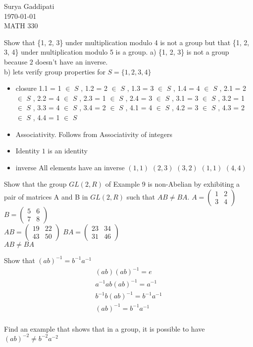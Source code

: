 \documentclass[12pt]{article}
\newenvironment{faq}{\begin{description}[style=nextline]}{\end{description}}
\begin{document}
 
Surya Gaddipati\\
\today \\
MATH 330 
\begin{faq}
\item[Show that \{1, 2, 3\} under multiplication modulo 4 is not a group but that \{1, 2, 3, 4\} under multiplication modulo 5 is a group.]
  a) \{1, 2, 3\}  is not a group because  $2$ doesn't have an inverse. \\
b) lets verify group properties for $S = \{1, 2, 3, 4\} $

 \begin{itemize}
   \item closure
     1.1 = 1 $\in$ $S$ , 
     1.2 = 2 $\in$ $S$ , 
     1.3 = 3 $\in$ $S$ , 
     1.4 = 4 $\in$ $S$ , 
     2.1 = 2 $\in$ $S$ , 
     2.2 = 4 $\in$ $S$ , 
     2.3 = 1 $\in$ $S$ , 
     2.4 = 3 $\in$ $S$ , 
     3.1 = 3 $\in$ $S$ , 
     3.2 = 1 $\in$ $S$ , 
     3.3 = 4 $\in$ $S$ , 
     3.4 = 2 $\in$ $S$ , 
     4.1 = 4 $\in$ $S$ , 
     4.2 = 3 $\in$ $S$ , 
     4.3 = 2 $\in$ $S$ , 
     4.4 = 1 $\in$ $S$  
   \item Associativity.
     Follows from Associativity of integers
   \item Identity
     $1$ is an identity 
   \item inverse
     All elements have an inverse
     $(1,1)$  $(2,3)$ $(3,2)$ $(1,1)$ $(4,4)$
  \end{itemize}
\item[Show that the group $GL(2, R)$ of Example 9 is non-Abelian by exhibiting a pair of matrices A and B in $GL(2, R)$ such that $AB\neq BA$.]
  $A = \left( \begin{matrix} 1&2\\ 3&4 \end{matrix} \right)$
  $B = \left( \begin{matrix} 5&6\\ 7&8 \end{matrix} \right)$ \\
  $AB = \left( \begin{matrix} 19&22\\ 43&50 \end{matrix} \right)$
  $BA = \left( \begin{matrix} 23&34\\ 31&46 \end{matrix} \right)$\\
  $AB\neq BA$
 
\item[Show that $(ab)^{-1} = b^{-1}a^{-1}$]
  \begin{equation}
  \begin{split}
    (ab)(ab)^{-1} = e \\
    a^{-1} a b (ab)^{-1} = a^{-1}\\
    b^{-1}b (ab)^{-1} = b^{-1}a^{-1}\\
    (ab)^{-1} = b^{-1}a^{-1} \\
  \end{split}
  \end{equation}
\item[Find an example that shows that in a group, it is possible to have $(ab)^{-2} \neq b^{-2}a^{-2}$]


\end{faq}
\end{document}
